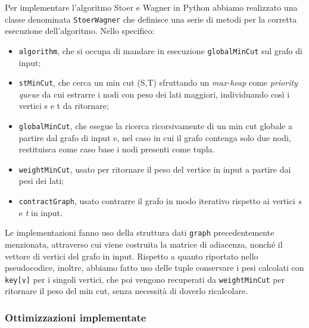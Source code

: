 Per implementare l'algoritmo Stoer e Wagner in Python abbiamo realizzato una classe denominata \texttt{StoerWagner} che definisce una serie di metodi per la corretta esecuzione dell'algoritmo.
Nello specifico: 

\begin{itemize}
    \item \texttt{algorithm}, che si occupa di mandare in esecuzione \texttt{globalMinCut} sul grafo di input;
    \item \texttt{stMinCut}, che cerca un min cut (S,T) sfruttando un \textit{max-heap} come \textit{priority queue} da cui estrarre i nodi con peso dei lati maggiori, individuando così i vertici s e t da ritornare;
    \item \texttt{globalMinCut}, che esegue la ricerca ricorsivamente di un min cut globale a partire dal grafo di input e, nel caso in cui il grafo contenga solo due nodi, restituisca come caso base i nodi presenti come tupla.
    \item \texttt{weightMinCut}, usato per ritornare il peso del vertice in input a partire dai pesi dei lati;
    \item \texttt{contractGraph}, usato contrarre il grafo in modo iterativo rispetto ai vertici \textit{s} e \textit{t} in input. 
\end{itemize}

Le implementazioni fanno uso della struttura dati \texttt{graph} precedentemente menzionata, attraverso cui viene costruita la matrice di adiacenza, nonché il vettore di vertici del grafo in input. Rispetto a quanto riportato nello pseudocodice, inoltre, abbiamo fatto uso delle tuple conservare i pesi calcolati con \texttt{key[v]} per i singoli vertici, che poi vengono recuperati da \texttt{weightMinCut} per ritornare il peso del min cut, senza necessità di doverlo ricalcolare.

\subsubsection{Ottimizzazioni implementate}

